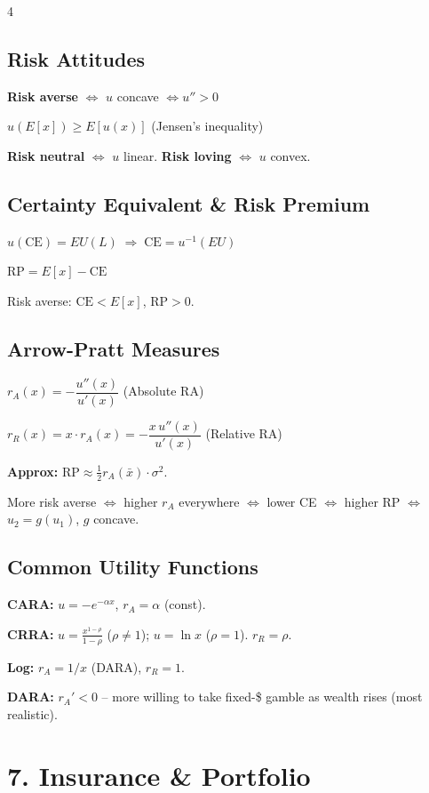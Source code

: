 \documentclass[8pt,landscape]{extarticle}
\newcommand{\HI}[1]{\colorbox{yellow!30}{#1}}
\begin{document}
\begin{multicols}{4}
\subsection{\HI{Risk Attitudes}}
\textbf{Risk averse} $\Leftrightarrow$ $u$ concave $\Leftrightarrow u''>0$

$u(E[x]) \geq E[u(x)]$ (Jensen's inequality)

\textbf{Risk neutral} $\Leftrightarrow$ $u$ linear. \textbf{Risk loving} $\Leftrightarrow$ $u$ convex.

\subsection{\HI{Certainty Equivalent \& Risk Premium}}
$u(\text{CE}) = EU(L) \;\Rightarrow\; \text{CE} = u^{-1}(EU)$

\HI{$\text{RP} = E[x] - \text{CE}$}

Risk averse: $\text{CE} < E[x]$, $\text{RP} > 0$.

\subsection{Arrow-Pratt Measures}
\HI{$r_A(x) = -\dfrac{u''(x)}{u'(x)}$} \quad (Absolute RA)

$r_R(x) = x\cdot r_A(x) = -\dfrac{x\,u''(x)}{u'(x)}$ \quad (Relative RA)

\textbf{Approx:} $\text{RP} \approx \frac{1}{2}r_A(\bar{x})\cdot\sigma^2$.

More risk averse $\Leftrightarrow$ higher $r_A$ everywhere $\Leftrightarrow$ lower CE $\Leftrightarrow$ higher RP $\Leftrightarrow$ $u_2 = g(u_1)$, $g$ concave.

\subsection{Common Utility Functions}
\textbf{CARA:} $u=-e^{-\alpha x}$, $r_A=\alpha$ (const).

\textbf{CRRA:} $u=\frac{x^{1-\rho}}{1-\rho}$ ($\rho\neq 1$); $u=\ln x$ ($\rho=1$). $r_R=\rho$.

\textbf{Log:} $r_A=1/x$ (DARA), $r_R=1$.

\textbf{DARA:} $r_A'<0$ -- more willing to take fixed-\$ gamble as wealth rises (most realistic).

\section{7. Insurance \& Portfolio}


\end{multicols}
\end{document}
